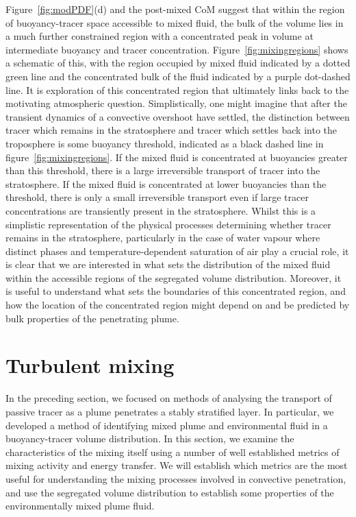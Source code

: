 \documentclass[a4paper]{article}
\begin{document}
Figure~\ref{fig:modPDF}(d) and the post-mixed CoM suggest that within the region of buoyancy-tracer space
accessible to mixed fluid, the bulk of the volume lies in a much further constrained region with a
concentrated peak in volume at intermediate buoyancy and tracer concentration. Figure~\ref{fig:mixingregions}
shows a schematic of this, with the region occupied by mixed fluid indicated by a dotted green line and the
concentrated bulk of the fluid indicated by a purple dot-dashed line. It is exploration of this concentrated
region that ultimately links back to the motivating atmospheric question. Simplistically, one might imagine
that after the transient dynamics of a convective overshoot have settled, the distinction between tracer which
remains in the stratosphere and tracer which settles back into the troposphere is some buoyancy threshold,
indicated as a black dashed line in figure~\ref{fig:mixingregions}. If the mixed fluid is concentrated at
buoyancies greater than this threshold, there is a large irreversible transport of tracer into the
stratosphere. If the mixed fluid is concentrated at lower buoyancies than the threshold, there is only a small
irreversible transport even if large tracer concentrations are transiently present in the stratosphere. Whilst
this is a simplistic representation of the physical processes determining whether tracer remains in the
stratosphere, particularly in the case of water vapour where distinct phases and temperature-dependent
saturation of air play a crucial role, it is clear that we are interested in what sets the distribution of the
mixed fluid within the accessible regions of the segregated volume distribution. Moreover, it is useful to
understand what sets the boundaries of this concentrated region, and how the location of the concentrated
region might depend on and be predicted by bulk properties of the penetrating plume.


\section{Turbulent mixing}
\label{sec:turbmix}
In the preceding section, we focused on methods of analysing the transport of passive tracer as a plume
penetrates a stably stratified layer. In particular, we developed a method of identifying mixed plume and
environmental fluid in a buoyancy-tracer volume distribution. In this section, we examine the characteristics
of the mixing itself using a number of well established metrics of mixing activity and energy transfer. We
will establish which metrics are the most useful for understanding the mixing processes involved in convective
penetration, and use the segregated volume distribution to establish some properties of the
environmentally mixed plume fluid.
\end{document}
